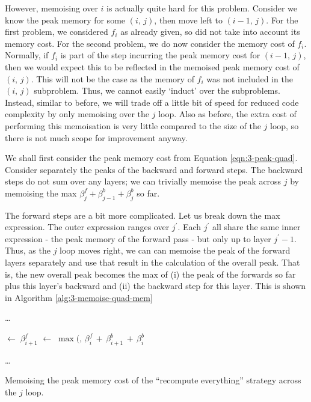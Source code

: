 However, memoising over  \(i\) is actually quite hard for this problem.
Consider we know the peak memory for some \((i,\,j)\), then move left to \((i-1,\,j)\).
For the first problem, we considered \(f_i\) as already given, so did not take into account its memory cost.
For the second problem, we do now consider the memory cost of \(f_i\).
Normally, if \(f_i\) is part of the step incurring the peak memory cost for \((i-1,\,j)\), then we would expect this to be reflected in the memoised peak memory cost of \((i,\,j)\).
This will not be the case as the memory of \(f_i\) was not included in the \((i,\,j)\) subproblem.
Thus, we cannot easily `induct' over the subproblems.
Instead, similar to before, we will trade off a little bit of speed for reduced code complexity by only memoising over the \(j\) loop.
Also as before, the extra cost of performing this memoisation is very little compared to the size of the \(j\) loop, so there is not much scope for improvement anyway.

We shall first consider the peak memory cost from Equation \ref{eqn:3-peak-quad}.
Consider separately the peaks of the backward and forward steps.
The backward steps do not sum over any layers;
we can trivially memoise the peak across \(j\) by memoising the max \(\beta^f_j + \beta^b_{j-1} + \beta^b_{j}\) so far.

The forward steps are a bit more complicated.
Let us break down the max expression.
The outer expression ranges over \(j^\prime\).
Each \(j^\prime\) all share the same inner expression - the peak memory of the forward pass - but only  up to layer \(j^\prime -1\).
Thus, as the \(j\) loop moves right, we can can memoise the peak of the forward layers separately and use that result in the calculation of the overall peak.
That is, the new overall peak becomes the max of (i) the peak of the forwards so far plus this layer's backward and (ii) the backward step for this layer.
This is shown in Algorithm \ref{alg:3-memoise-quad-mem}

\begin{algorithm}[htb]
    \DontPrintSemicolon

    \ldots\;
    \BlankLine

    \PeakF \(\leftarrow\; \beta^f_{i+1}\)\;
    \PeakQuad \(\leftarrow\; \max(\)\PeakF\(,\, \beta^f_{i}\,+\,\beta^b_{i+1}\,+\,\beta^b_i\)\;
    \BlankLine

    \ldots\;
    \caption{Memoising the peak memory cost of the ``recompute everything'' strategy across the \(j\) loop.}
    \label{alg:3-memoise-quad-mem}
\end{algorithm}

